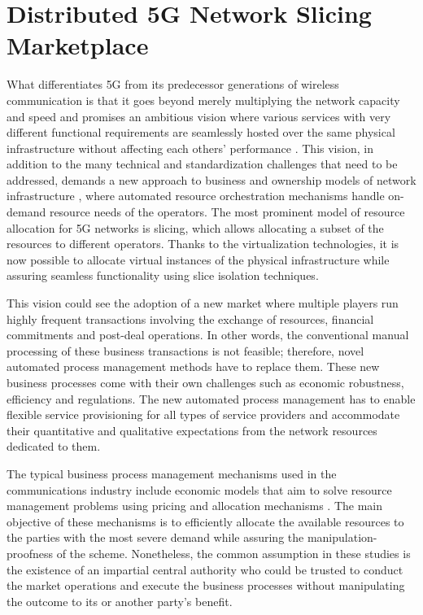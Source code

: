 \section{Distributed \ac{5G} Network Slicing Marketplace}
\label{BC:sec:slicing}


What differentiates \ac{5G} from its predecessor generations of wireless communication is that it goes beyond merely multiplying the network capacity and speed and promises an ambitious vision where various services with very different functional requirements are seamlessly hosted over the same physical infrastructure without affecting each others' performance \cite{7980666}. This vision, in addition to the many technical and standardization challenges that need to be addressed, demands a new approach to business and ownership models of network infrastructure \cite{Nima-5g-evol}, where automated resource orchestration mechanisms handle on-demand resource needs of the operators. The most prominent model of resource allocation for \ac{5G} networks is slicing, which allows allocating a subset of the resources to different operators. Thanks to the virtualization technologies, it is now possible to allocate virtual instances of the physical infrastructure while assuring seamless functionality using slice isolation techniques.


This vision could see the adoption of a new market where multiple players run highly frequent transactions involving the exchange of resources, financial commitments and post-deal operations. In other words, the conventional manual processing of these business transactions is not feasible; therefore, novel automated process management methods have to replace them. These new business processes come with their own challenges such as economic robustness, efficiency and regulations. 
The new automated process management has to enable flexible service provisioning for all types of service providers and accommodate their quantitative and qualitative expectations from the network resources dedicated to them.

The typical business process management mechanisms used in the communications industry include economic models that aim to solve resource management problems using pricing and allocation mechanisms \cite{8480631}. The main objective of these mechanisms is to efficiently allocate the available resources to the parties with the most severe demand while assuring the manipulation-proofness of the scheme. Nonetheless, the common assumption in these studies is the existence of an impartial central authority who could be trusted to conduct the market operations and execute the business processes without manipulating the outcome to its or another party's benefit. 


